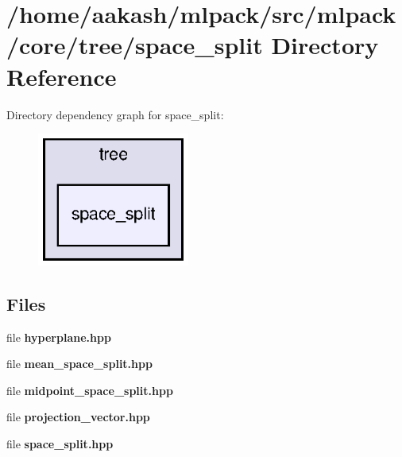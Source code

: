 \section{/home/aakash/mlpack/src/mlpack/core/tree/space\+\_\+split Directory Reference}
\label{dir_ed97a359292189f6ce70548f8cfe7fb7}
Directory dependency graph for space\+\_\+split\+:
\nopagebreak
\begin{figure}[H]
\begin{center}
\leavevmode
\includegraphics[width=142pt]{dir_ed97a359292189f6ce70548f8cfe7fb7_dep}
\end{center}
\end{figure}
\subsection*{Files}
\begin{DoxyCompactItemize}
\item 
file \textbf{ hyperplane.\+hpp}
\item 
file \textbf{ mean\+\_\+space\+\_\+split.\+hpp}
\item 
file \textbf{ midpoint\+\_\+space\+\_\+split.\+hpp}
\item 
file \textbf{ projection\+\_\+vector.\+hpp}
\item 
file \textbf{ space\+\_\+split.\+hpp}
\end{DoxyCompactItemize}
